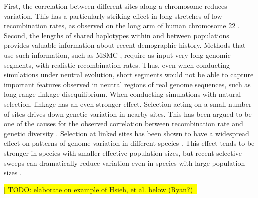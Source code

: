 \documentclass[hidelinks]{article}
\begin{document}
First, the correlation between different sites along a chromosome reduces
variation. This has a particularly striking effect in long stretches of
low recombination rates, as observed on the long arm of human chromosome 22 \citep{Dawson2002}.
Second, the lengths of shared haplotypes within and
between populations provides valuable information about recent demographic history.
Methods that use such information, such as MSMC \citep{Schiffels2020}, require as
input very long genomic segments, with realistic recombination rates.
Thus, even when conducting simulations under neutral evolution, short segments
would not be able to capture important features observed in neutral regions of
real genome sequences, such as long-range linkage disequilibrium.
%
When conducting simulations with natural selection, linkage has
an even stronger effect. Selection acting on a small number of sites drives down
genetic variation in nearby sites. This has been argued to be one of the causes
for the observed correlation between recombination rate and genetic diversity
\citep{Begun1992}. Selection at linked sites has been shown to have a widespread
effect on patterns of genome variation in different species \citep{McVicker2009,Charlesworth2012}. This effect tends to be stronger in species
with smaller effective population sizes, but recent selective sweeps can dramatically
reduce variation even in species with large population sizes \citep{Lynd2010}.
%
%
%

\noindent\colorbox{yellow}{[ TODO: elaborate on example of Hsieh, et al. below (Ryan?) ]}
\end{document}
